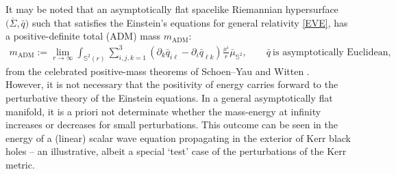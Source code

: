 \documentclass[pdftex]{sigma}
\def\ptl{\partial}%
\def\olin#1{\overline{#1}{}}%
\numberwithin{equation}{section}
\begin{document}
It may be noted that an asymptotically flat spacelike Riemannian hypersurface $\bigl(\olin{\Sigma}, \bar{q}\bigr)$ such that \smash{$\bar{M} = \olin{\Sigma} \times \mathbb{R}$} satisfies the Einstein's equations for general relativity \eqref{EVE}, has a positive-definite total (ADM) mass $m_{\text{ADM}}$:
\begin{align*}%
m_{\text{ADM}} := \lim_{r \to \infty} \int_{\mathbb{S}^2(r)} \sum^3_{i,j,k=1} (\ptl_k \bar{q}_{i \ell} - \ptl_i \bar{q}_{\ell k}) \frac{x^i}{r} \bar{\mu}_{\mathbb{S}^2}, \qquad \bar{q} \ \text{is asymptotically Euclidean},
\end{align*}
from the celebrated positive-mass theorems of Schoen--Yau and Witten \cite{schoen-yau-1,schoen-yau-2,witten-pmt}. However, it is not necessary that the positivity of energy carries forward to the perturbative theory of the Einstein equations. In a general asymptotically flat manifold, it is a priori not determinate whether the mass-energy at infinity increases or decreases for small perturbations.
 This outcome can be seen in the energy of a (linear) scalar wave equation propagating in the exterior of Kerr black holes -- an illustrative, albeit a special `test' case of the perturbations of the Kerr metric.
\end{document}
